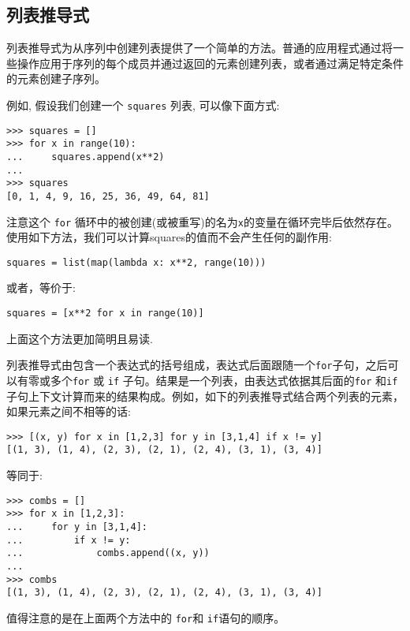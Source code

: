 \subsection{列表推导式\label{DataStructures:ListComprehensoions}}
列表推导式为从序列中创建列表提供了一个简单的方法。普通的应用程式通过将一些操作应用于序列的每个成员并通过返回的元素创建列表，或者通过满足特定条件的元素创建子序列。

例如, 假设我们创建一个 \texttt{squares} 列表, 可以像下面方式:
\begin{lstlisting}
>>> squares = []
>>> for x in range(10):
...     squares.append(x**2)
...
>>> squares
[0, 1, 4, 9, 16, 25, 36, 49, 64, 81]
\end{lstlisting}
注意这个 \texttt{for} 循环中的被创建(或被重写)的名为\texttt{x}的变量在循环完毕后依然存在。使用如下方法，我们可以计算squares的值而不会产生任何的副作用:
\begin{lstlisting}
squares = list(map(lambda x: x**2, range(10)))
\end{lstlisting}
或者，等价于:
\begin{lstlisting}
squares = [x**2 for x in range(10)]
\end{lstlisting}
上面这个方法更加简明且易读.

列表推导式由包含一个表达式的括号组成，表达式后面跟随一个\texttt{for}子句，之后可以有零或多个\texttt{for} 或 \texttt{if} 子句。结果是一个列表，由表达式依据其后面的\texttt{for} 和\texttt{if} 子句上下文计算而来的结果构成。例如，如下的列表推导式结合两个列表的元素，如果元素之间不相等的话:
\begin{lstlisting}
>>> [(x, y) for x in [1,2,3] for y in [3,1,4] if x != y]
[(1, 3), (1, 4), (2, 3), (2, 1), (2, 4), (3, 1), (3, 4)]
\end{lstlisting}
等同于:
\begin{lstlisting}
>>> combs = []
>>> for x in [1,2,3]:
...     for y in [3,1,4]:
...         if x != y:
...             combs.append((x, y))
...
>>> combs
[(1, 3), (1, 4), (2, 3), (2, 1), (2, 4), (3, 1), (3, 4)]
\end{lstlisting}
值得注意的是在上面两个方法中的 \texttt{for}和 \texttt{if}语句的顺序。

